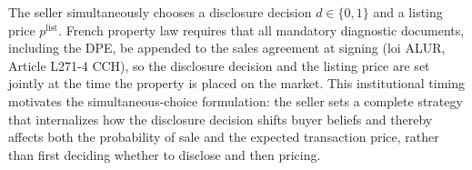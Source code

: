 The seller simultaneously chooses a disclosure decision $d\in\{0,1\}$ and a listing price $p^{\text{list}}$. French property law requires that all mandatory diagnostic documents, including the DPE, be appended to the sales agreement at signing (loi ALUR, Article L271-4 CCH), so the disclosure decision and the listing price are set jointly at the time the property is placed on the market. This institutional timing motivates the simultaneous-choice formulation: the seller sets a complete strategy that internalizes how the disclosure decision shifts buyer beliefs and thereby affects both the probability of sale and the expected transaction price, rather than first deciding whether to disclose and then pricing.
